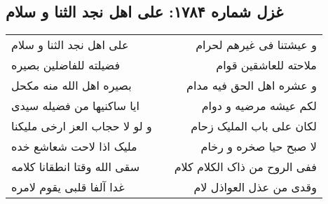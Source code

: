 \begin{center}
\section*{غزل شماره ۱۷۸۴: علی اهل نجد الثنا و سلام}
\label{sec:1784}
\begin{longtable}{l p{0.5cm} r}
علی اهل نجد الثنا و سلام
&&
و عیشتنا فی غیرهم لحرام
\\
فضیلته للفاضلین بصیره
&&
ملاحته للعاشقین قوام
\\
بصیره اهل الله منه مکحل
&&
و عشره اهل الحق فیه مدام
\\
ایا ساکنیها من فضیله سیدی
&&
لکم عیشه مرضیه و دوام
\\
و لو لا حجاب العز ارخی ملیکنا
&&
لکان علی باب الملیک زحام
\\
ملیک اذا لاحت شعاشع خده
&&
لا صبح حیا صخره و رخام
\\
سقی الله وقتا انطقانا کلامه
&&
ففی الروح من ذاک الکلام کلام
\\
غدا آلفا قلبی یقوم لامره
&&
وقدی من عذل العواذل لام
\\
\end{longtable}
\end{center}
